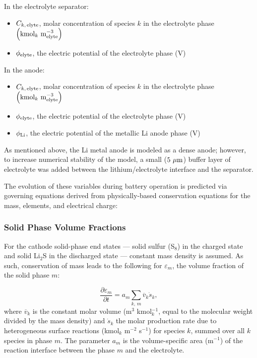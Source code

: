 \documentclass{elsarticle}
\begin{document}
In the electrolyte separator:
\begin{itemize}
    \item $C_{k,\,{\rm elyte}}$, molar concentration of species $k$ in the electrolyte phase $\left({\rm kmol}_k ~ {\rm m_{elyte}^{-3}}\right)$
    \item $\phi_{\rm elyte}$, the electric potential of the electrolyte phase (V)
\end{itemize}

In the anode:
\begin{itemize}
    \item $C_{k,\,{\rm elyte}}$, molar concentration of species $k$ in the electrolyte phase $\left({\rm kmol}_k ~ {\rm m_{elyte}^{-3}}\right)$
    \item $\phi_{\rm elyte}$, the electric potential of the electrolyte phase (V)
    \item $\phi_{\rm Li}$, the electric potential of the metallic Li anode phase (V)
\end{itemize}

As mentioned above, the Li metal anode is modeled as a dense anode; however, to increase numerical stability of the model, a small ($5 ~ \mu \rm {m}$) buffer layer of electrolyte was added between the lithium/electrolyte interface and the separator.

The evolution of these variables during battery operation is predicted via governing equations derived from physically-based conservation equations for the mass, elements, and electrical charge:

\subsubsection{Solid Phase Volume Fractions}
For the cathode solid-phase end states --- solid sulfur (S$_8$) in the charged state and solid Li$_2$S in the discharged state --- constant mass density is assumed. As such, conservation of mass leads to the following for $\varepsilon_m$, the volume fraction of the solid phase $m$: 

\begin{equation}\label{eq:dEps_dt}
    \frac{\partial \varepsilon_m}{\partial t} = a_m\sum_{k,\,m} \overline{v}_k\dot{s}_k,
\end{equation}
where $\overline{v}_k$ is the constant molar volume (m$^3$ kmol$_k^{-1}$, equal to the molecular weight divided by the mass density) and $\dot{s}_k$ the molar production rate due to heterogeneous surface reactions (kmol$_k$ m$^{-2}$ s$^{-1}$) for species $k$, summed over all $k$ species in phase $m$.  The parameter $a_m$ is the volume-specific area (m$^{-1}$) of the reaction interface between the phase $m$ and the electrolyte.
\end{document}
